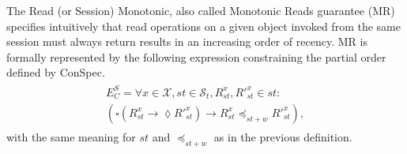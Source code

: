 \documentclass[conference]{IEEEtran}
\begin{document}
	The Read (or Session) Monotonic, also called Monotonic Reads guarantee (MR) specifies intuitively that read operations on a given object invoked from the same session must always return results in an increasing order of recency.   MR is formally represented by the following expression constraining the partial order defined by ConSpec.
	\begin{align}\label{eqn:MR}
	\begin{split}
	E^S_C =  \forall x \in \mathcal{X}, \mathit{st} \in \mathcal{S}_t, R_\mathit{st}^x, R'^x_\mathit{st} \in \mathit{st}: \\
	\left( \square \left( R_\mathit{st}^x \rightarrow \lozenge R'^{x}_\mathit{st} \right)
	\rightarrow R_\mathit{st}^x \preccurlyeq_{\mathit{st}+w} R'^{x}_\mathit{st} \right),
	\end{split}
	\end{align} with the same meaning for $\mathit{st}$ and $\preccurlyeq_{\mathit{st}+w}$ as in the previous definition.
	
\end{document}

